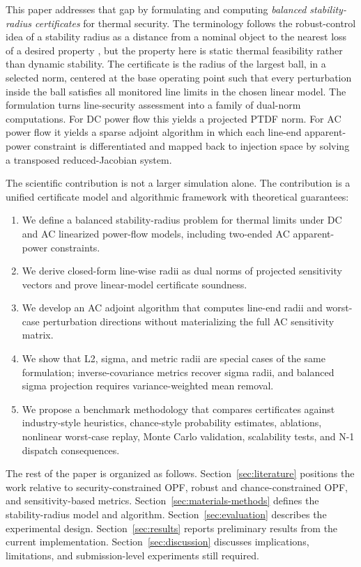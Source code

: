 \documentclass[energies,article,submit,pdftex,moreauthors]{Definitions/mdpi}
\begin{document}
This paper addresses that gap by formulating and computing \emph{balanced stability-radius certificates} for thermal security. The terminology follows the robust-control idea of a stability radius as a distance from a nominal object to the nearest loss of a desired property \citep{HinrichsenPritchard1986}, but the property here is static thermal feasibility rather than dynamic stability. The certificate is the radius of the largest ball, in a selected norm, centered at the base operating point such that every perturbation inside the ball satisfies all monitored line limits in the chosen linear model. The formulation turns line-security assessment into a family of dual-norm computations. For DC power flow this yields a projected PTDF norm. For AC power flow it yields a sparse adjoint algorithm in which each line-end apparent-power constraint is differentiated and mapped back to injection space by solving a transposed reduced-Jacobian system.

The scientific contribution is not a larger simulation alone. The contribution is a unified certificate model and algorithmic framework with theoretical guarantees:
\begin{enumerate}
  \item We define a balanced stability-radius problem for thermal limits under DC and AC linearized power-flow models, including two-ended AC apparent-power constraints.
  \item We derive closed-form line-wise radii as dual norms of projected sensitivity vectors and prove linear-model certificate soundness.
  \item We develop an AC adjoint algorithm that computes line-end radii and worst-case perturbation directions without materializing the full AC sensitivity matrix.
  \item We show that L2, sigma, and metric radii are special cases of the same formulation; inverse-covariance metrics recover sigma radii, and balanced sigma projection requires variance-weighted mean removal.
  \item We propose a benchmark methodology that compares certificates against industry-style heuristics, chance-style probability estimates, ablations, nonlinear worst-case replay, Monte Carlo validation, scalability tests, and N-1 dispatch consequences.
\end{enumerate}

The rest of the paper is organized as follows. Section~\ref{sec:literature} positions the work relative to security-constrained OPF, robust and chance-constrained OPF, and sensitivity-based metrics. Section~\ref{sec:materials-methods} defines the stability-radius model and algorithm. Section~\ref{sec:evaluation} describes the experimental design. Section~\ref{sec:results} reports preliminary results from the current implementation. Section~\ref{sec:discussion} discusses implications, limitations, and submission-level experiments still required.
\end{document}
